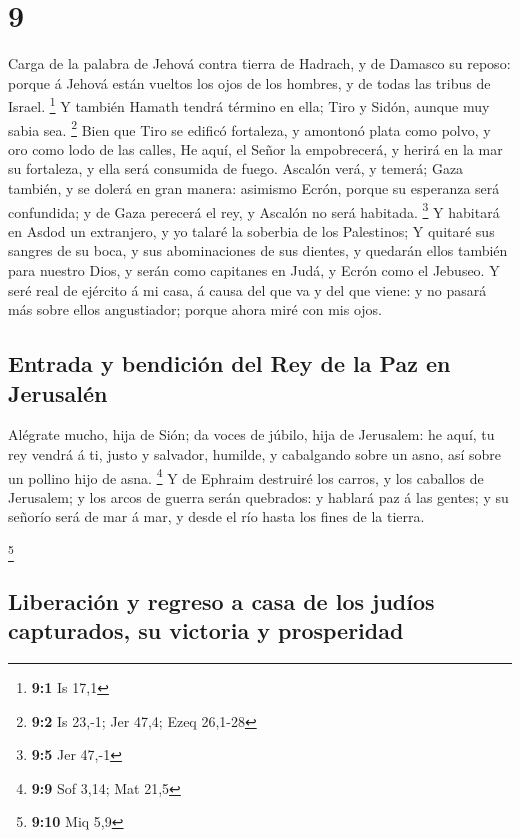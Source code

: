 \hypertarget{section-8}{%
\section{9}\label{section-8}}

 Carga de la palabra de Jehová contra tierra de Hadrach, y
de Damasco su reposo: porque á Jehová están vueltos los ojos de los
hombres, y de todas las tribus de Israel. \footnote{\textbf{9:1} Is 17,1}
 Y también Hamath tendrá término en ella; Tiro y Sidón,
aunque muy sabia sea. \footnote{\textbf{9:2} Is 23,-1; Jer 47,4; Ezeq
  26,1-28}  Bien que Tiro se edificó fortaleza, y amontonó
plata como polvo, y oro como lodo de las calles,  He aquí,
el Señor la empobrecerá, y herirá en la mar su fortaleza, y ella será
consumida de fuego.  Ascalón verá, y temerá; Gaza también, y
se dolerá en gran manera: asimismo Ecrón, porque su esperanza será
confundida; y de Gaza perecerá el rey, y Ascalón no será habitada.
\footnote{\textbf{9:5} Jer 47,-1}  Y habitará en Asdod un
extranjero, y yo talaré la soberbia de los Palestinos;  Y
quitaré sus sangres de su boca, y sus abominaciones de sus dientes, y
quedarán ellos también para nuestro Dios, y serán como capitanes en
Judá, y Ecrón como el Jebuseo.  Y seré real de ejército á mi
casa, á causa del que va y del que viene: y no pasará más sobre ellos
angustiador; porque ahora miré con mis ojos.

\hypertarget{entrada-y-bendiciuxf3n-del-rey-de-la-paz-en-jerusaluxe9n}{%
\subsection{Entrada y bendición del Rey de la Paz en
Jerusalén}\label{entrada-y-bendiciuxf3n-del-rey-de-la-paz-en-jerusaluxe9n}}

 Alégrate mucho, hija de Sión; da voces de júbilo, hija de
Jerusalem: he aquí, tu rey vendrá á ti, justo y salvador, humilde, y
cabalgando sobre un asno, así sobre un pollino hijo de asna. \footnote{\textbf{9:9}
  Sof 3,14; Mat 21,5}  Y de Ephraim destruiré los carros, y
los caballos de Jerusalem; y los arcos de guerra serán quebrados: y
hablará paz á las gentes; y su señorío será de mar á mar, y desde el río
hasta los fines de la tierra.

\footnote{\textbf{9:10} Miq 5,9}

\hypertarget{liberaciuxf3n-y-regreso-a-casa-de-los-juduxedos-capturados-su-victoria-y-prosperidad}{%
\subsection{Liberación y regreso a casa de los judíos capturados, su
victoria y
prosperidad}\label{liberaciuxf3n-y-regreso-a-casa-de-los-juduxedos-capturados-su-victoria-y-prosperidad}}

